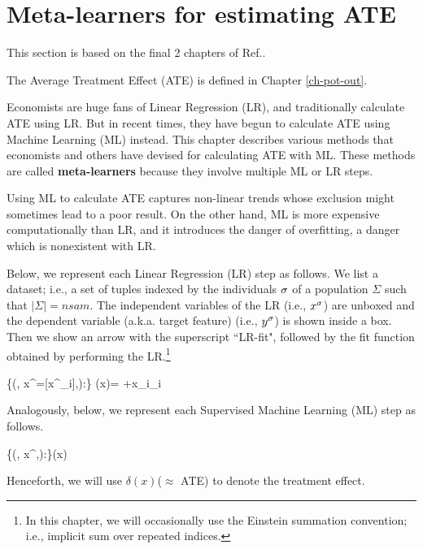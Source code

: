 \chapter{Meta-learners
for estimating ATE}
\label{ch-meta-learners}


This section
is based on the final 2 chapters of
Ref.\cite{alves-book}.

The Average Treatment Effect (ATE)
is defined in Chapter \ref{ch-pot-out}.

Economists are huge fans of Linear Regression (LR),
and traditionally calculate  ATE using LR.
But in recent times,
they have begun to
calculate ATE using Machine Learning
(ML) instead. 
This chapter describes various methods
that economists and others have devised
for calculating ATE with ML.
These methods
are called {\bf meta-learners}
because they involve multiple
ML or LR steps.

Using ML
to calculate
ATE
captures non-linear trends
whose exclusion might sometimes lead to a poor result. 
On the other hand,
ML is more expensive computationally
than LR, 
and it introduces
the danger of overfitting, a danger
which is nonexistent with LR.




Below,
we represent each
Linear Regression (LR) step
as follows. 
We list a dataset; i.e., a 
set of tuples indexed by
the individuals $\sigma$
of a population $\Sigma$
such that $|\Sigma|=nsam$.
The independent variables 
of the LR (i.e., $x^\sigma$)
are unboxed and the
 dependent variable 
(a.k.a. target feature)
(i.e., $y^\sigma$)
is shown inside a box.
Then we show an arrow with the
superscript ``LR-fit",
followed by the fit function
obtained by performing the LR.\footnote{
In this chapter,
we will occasionally
use the Einstein summation convention;
i.e.,
implicit sum over
repeated indices.}



\beq
\{(\s, x^\s =[x^\s_i],):\s\in \Sigma\}
\lrarr
 \haty(x)=
\alp +x_i\beta_i
\eeq


Analogously, below,
we represent each
Supervised Machine
 Learning (ML) step as follows.


\beq
\{(\s, x^\s,):\s\in \Sigma\}\mlarr \haty(x)
\label{eq-gen-ml}
\eeq


Henceforth, we will use $\delta(x)$($\approx$ ATE) to
denote the treatment effect.



